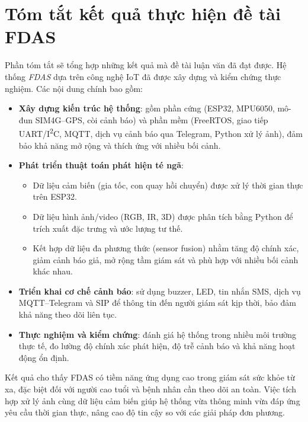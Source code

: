 \section{Tóm tắt kết quả thực hiện đề tài FDAS}
\label{sec:summary}

Phần tóm tắt sẽ tổng hợp những kết quả mà đề tài luận văn đã đạt được. 
Hệ thống \textit{FDAS} dựa trên công nghệ IoT đã được xây dựng và kiểm chứng thực nghiệm. 
Các nội dung chính bao gồm:  

\begin{itemize}
    \item \textbf{Xây dựng kiến trúc hệ thống}: gồm phần cứng (ESP32, MPU6050, mô-đun SIM4G--GPS, còi cảnh báo) và phần mềm (FreeRTOS, giao tiếp UART/I\textsuperscript{2}C, MQTT, dịch vụ cảnh báo qua Telegram, Python xử lý ảnh), đảm bảo khả năng mở rộng và thích ứng với nhiều bối cảnh.
    
    \item \textbf{Phát triển thuật toán phát hiện té ngã}: 
    \begin{itemize}
        \item Dữ liệu cảm biến (gia tốc, con quay hồi chuyển) được xử lý thời gian thực trên ESP32.
        \item Dữ liệu hình ảnh/video (RGB, IR, 3D) được phân tích bằng Python để trích xuất đặc trưng và ước lượng tư thế.
        \item Kết hợp dữ liệu đa phương thức (sensor fusion) nhằm tăng độ chính xác, giảm cảnh báo giả, mở rộng tầm giám sát và phù hợp với nhiều bối cảnh khác nhau.
    \end{itemize}
    
    \item \textbf{Triển khai cơ chế cảnh báo}: sử dụng buzzer, LED, tin nhắn SMS, dịch vụ MQTT--Telegram và SIP để thông tin đến người giám sát kịp thời, bảo đảm khả năng theo dõi liên tục.
    
    \item \textbf{Thực nghiệm và kiểm chứng}: đánh giá hệ thống trong nhiều môi trường thực tế, đo lường độ chính xác phát hiện, độ trễ cảnh báo và khả năng hoạt động ổn định.
\end{itemize}

Kết quả cho thấy FDAS có tiềm năng ứng dụng cao trong giám sát sức khỏe từ xa, đặc biệt đối với người cao tuổi và bệnh nhân cần theo dõi an toàn. 
Việc tích hợp xử lý ảnh cùng dữ liệu cảm biến giúp hệ thống vừa thông minh vừa đáp ứng yêu cầu thời gian thực, nâng cao độ tin cậy so với các giải pháp đơn phương.
